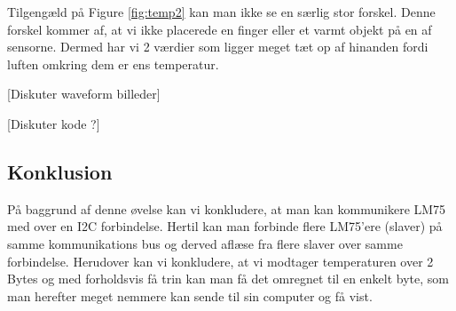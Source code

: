 \documentclass[../main.tex]{subfiles}
\begin{document}
Tilgengæld på Figure \ref{fig:temp2} kan man ikke se en særlig stor forskel. Denne forskel kommer af, at vi ikke placerede en finger eller et varmt objekt på en af sensorne. 
Dermed har vi 2 værdier som ligger meget tæt op af hinanden fordi luften omkring dem er ens temperatur.

[Diskuter waveform billeder]

[Diskuter kode ?]
\subsection{Konklusion}
På baggrund af denne øvelse kan vi konkludere, at man kan kommunikere LM75 med over en I2C forbindelse. Hertil kan man forbinde flere LM75'ere (slaver) på samme kommunikations bus og derved aflæse fra flere slaver over samme forbindelse.
Herudover kan vi konkludere, at vi modtager temperaturen over 2 Bytes og med forholdsvis få trin kan man få det omregnet til en enkelt byte, som man herefter meget nemmere kan sende til sin computer og få vist. 
\end{document}
